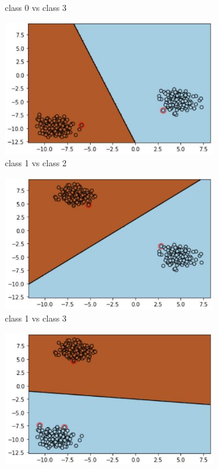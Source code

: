 \documentclass[11pt]{article}
\begin{document}
\begin{figure}[h!]
\begin{subfigure}[b]{0.45\textwidth}
	\caption{class 0 vs class 3}
	\label{fig:fig1.3.7.3}
	\end{subfigure}
	\begin{subfigure}[b]{0.45\textwidth}
	\centering
	\includegraphics[scale=0.6]{dataset1a_linear_svm_12_ds.jpg}
	\caption{class 1 vs class 2}
	\label{fig:fig1.3.7.4}
	\end{subfigure}
	\begin{subfigure}[b]{0.45\textwidth}
	\centering
	\includegraphics[scale=0.6]{dataset1a_linear_svm_13_ds.jpg}
	\caption{class 1 vs class 3}
	\label{fig:fig1.3.7.5}
	\end{subfigure}
	\begin{subfigure}[b]{0.45\textwidth}
	\centering
	\includegraphics[scale=0.6]{dataset1a_linear_svm_23_ds.jpg}

\end{subfigure}
\end{figure}
\end{document}
